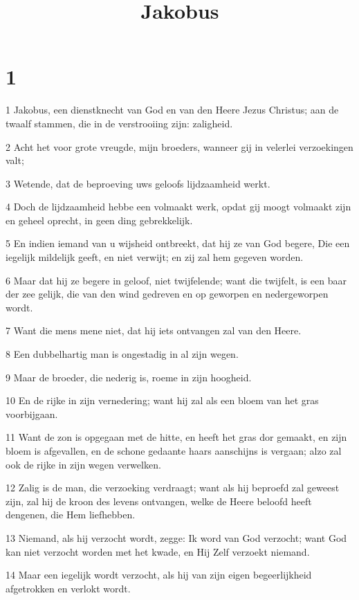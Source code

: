 

\title{Jakobus}



\chapter{1}

\par 1 Jakobus, een dienstknecht van God en van den Heere Jezus Christus; aan de twaalf stammen, die in de verstrooiing zijn: zaligheid.
\par 2 Acht het voor grote vreugde, mijn broeders, wanneer gij in velerlei verzoekingen valt;
\par 3 Wetende, dat de beproeving uws geloofs lijdzaamheid werkt.
\par 4 Doch de lijdzaamheid hebbe een volmaakt werk, opdat gij moogt volmaakt zijn en geheel oprecht, in geen ding gebrekkelijk.
\par 5 En indien iemand van u wijsheid ontbreekt, dat hij ze van God begere, Die een iegelijk mildelijk geeft, en niet verwijt; en zij zal hem gegeven worden.
\par 6 Maar dat hij ze begere in geloof, niet twijfelende; want die twijfelt, is een baar der zee gelijk, die van den wind gedreven en op geworpen en nedergeworpen wordt.
\par 7 Want die mens mene niet, dat hij iets ontvangen zal van den Heere.
\par 8 Een dubbelhartig man is ongestadig in al zijn wegen.
\par 9 Maar de broeder, die nederig is, roeme in zijn hoogheid.
\par 10 En de rijke in zijn vernedering; want hij zal als een bloem van het gras voorbijgaan.
\par 11 Want de zon is opgegaan met de hitte, en heeft het gras dor gemaakt, en zijn bloem is afgevallen, en de schone gedaante haars aanschijns is vergaan; alzo zal ook de rijke in zijn wegen verwelken.
\par 12 Zalig is de man, die verzoeking verdraagt; want als hij beproefd zal geweest zijn, zal hij de kroon des levens ontvangen, welke de Heere beloofd heeft dengenen, die Hem liefhebben.
\par 13 Niemand, als hij verzocht wordt, zegge: Ik word van God verzocht; want God kan niet verzocht worden met het kwade, en Hij Zelf verzoekt niemand.
\par 14 Maar een iegelijk wordt verzocht, als hij van zijn eigen begeerlijkheid afgetrokken en verlokt wordt.
